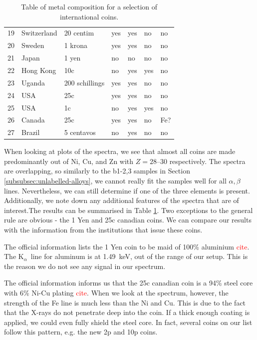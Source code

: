 \documentclass[11pt,a4paper,twoside,onecolumn]{article}
\newcommand{\reminder}[1]{\textcolor{red}{#1}}
\newcommand{\Kalpha}{$\mathrm{K}_\alpha$~}
\begin{document}
\begin{table}[!htbp]
\begin{tabular}{@{}lllllll@{}}
    19 & Switzerland    & 20 centim      & yes & yes & no  & no    \\
    20 & Sweden         & 1 krona        & yes & yes & no  & no    \\
    21 & Japan          & 1 yen          & no  & no  & no  & no    \\
    22 & Hong Kong      & 10c            & no  & yes & yes & no    \\
    23 & Uganda         & 200 schillings & yes & yes & no  & no    \\
    24 & USA            & 25c            & yes & yes & no  & no    \\
    25 & USA            & 1c             & no  & yes & yes & no    \\
    26 & Canada         & 25c            & yes & yes & no  & Fe?   \\
    27 & Brazil         & 5 centavos     & no  & yes & no  & no    \\ \bottomrule
    \end{tabular}
    \caption{Table of metal composition for a selection of international coins.}
    \label{tab:coin-measured}
\end{table}

When looking at plots of the spectra, we see that almost all coins are made predominantly out of Ni, Cu, and Zn with $Z=\numrange{28}{30}$ respectively. The spectra are overlapping, so similarly to the b1-2,3 samples in Section \ref{subsubsec:unlabelled-alloys}, we cannot really fit the samples well for all $\alpha, \beta$ lines. Nevertheless, we can still determine if one of the three elements is present. Additionally, we note down any additional features of the spectra that are of interest.The results can be summarised in Table \ref{tab:coin-measured}. Two exceptions to the general rule are obvious - the 1 Yen and 25c canadian coins. We can compare our results with the information from the institutions that issue these coins.

The official information lists the 1 Yen coin to be maid of 100\% aluminium \reminder{cite}. The \Kalpha line for aluminum is at \qty{1.49}{keV}, out of the range of our setup. This is the reason we do not see any signal in our spectrum.

The official information informs us that the 25c canadian coin is a 94\% steel core with 6\% Ni-Cu plating \reminder{cite}. When we look at the spectrum, however, the strength of the Fe line is much less than the Ni and Cu. This is due to the fact that the X-rays do not penetrate deep into the coin. If a thick enough coating is applied, we could even fully shield the steel core. In fact, several coins on our list follow this pattern, e.g. the new 2p and 10p coins.
\end{document}
